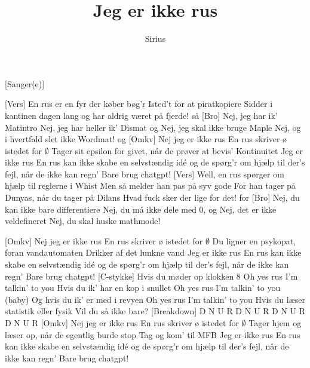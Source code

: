 \documentclass[a4paper,11pt]{article}
\title{Jeg er ikke rus}
\author{Sirius}
\begin{document}
\maketitle

\begin{roles}
[Sanger(e)] 
\end{roles}

\begin{song}
[Vers] En rus er en fyr der køber bøg'r
Isted't for at piratkopiere
Sidder i kantinen dagen lang
og har aldrig været på fjerde! så
[Bro]
Nej, jeg har ik' Matintro
Nej, jeg har heller ik' Dismat og
Nej, jeg skal ikke bruge Maple
Nej, og i hvertfald slet ikke Wordmat! og
[Omkv]
Nej jeg er ikke rus
En rus skriver ø istedet for $\emptyset$
Tager sit epsilon for givet, når de prøver at bevis'
Kontinuitet
Jeg er ikke rus
En rus kan ikke skabe en selvstændig idé 
og de spørg'r om hjælp til der's fejl, når de ikke kan regn'
Bare brug chatgpt!
[Vers]
Well, en rus spørger om hjælp til reglerne i Whist
Men så melder han pas på syv gode
For han tager på Dunyas, når du tager på Dilans
Hvad fuck sker der lige for det! for
[Bro]
Nej, du kan ikke bare differentiere
Nej, du må ikke dele med 0, og
Nej, det er ikke veldefineret
Nej, du skal huske mathmode!

[Omkv]
Nej jeg er ikke rus
En rus skriver ø istedet for $\emptyset$
Du ligner en psykopat, foran vandautomaten
Drikker af det lunkne vand
Jeg er ikke rus
En rus kan ikke skabe en selvstændig idé 
og de spørg'r om hjælp til der's fejl, når de ikke kan regn'
Bare brug chatgpt!
[C-stykke]
Hvis du møder op klokken 8
Oh yes rus I'm talkin' to you
Hvis du ik' har en kop i snullet
Oh yes rus I'm talkin' to you (baby)
Og hvis du ik' er med i revyen
Oh yes rus I'm talkin' to you
Hvis du læser statistik eller fysik
Vil du så ikke bare?
[Breakdown]
D N U R
D N U R
D N U R
D N U R
[Omkv]
Nej jeg er ikke rus
En rus skriver ø istedet for $\emptyset$
Tager hjem og læser op, når de egentlig burde stop
Tag og kom' til MFB
Jeg er ikke rus
En rus kan ikke skabe en selvstændig idé 
og de spørg'r om hjælp til der's fejl, når de ikke kan regn'
Bare brug chatgpt!
\end{song}
\end{document}
